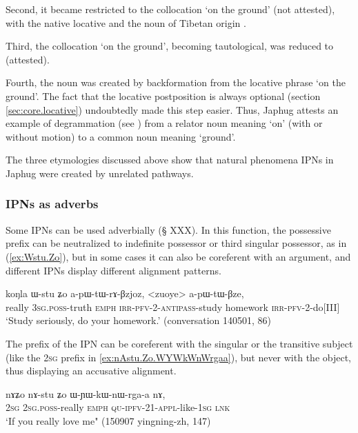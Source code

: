   Second, it  became restricted to the collocation  `on the ground' (not attested), with the native locative  and the  noun of Tibetan origin .
  
    Third, the collocation  `on the ground', becoming tautological, was reduced to  (attested).
 
 Fourth, the noun  was created by backformation from the locative phrase  `on the ground'. The fact that the locative postposition  is always optional (section \ref{sec:core.locative}) undoubtedly made this step easier.  Thus, Japhug attests an example of degrammation (see \citealt[135]{norde09degrammaticalization}) from a relator noun meaning `on' (with or without motion) to a common noun meaning `ground'. 

The three etymologies discussed above show that natural phenomena IPNs in Japhug were created by unrelated pathways.

\subsubsection{IPNs as adverbs}
Some IPNs can be used adverbially (§ XXX). In this function, the possessive prefix can be neutralized to indefinite possessor or third singular possessor, as  in (\ref{ex:Wstu.Zo}), but in some cases it can also be coreferent with an argument, and different IPNs display different alignment patterns.

\begin{exe}
\ex \label{ex:Wstu.Zo}
\gll koŋla ɯ-stu ʑo a-pɯ-tɯ-rɤ-βzjoz, <zuoye> a-pɯ-tɯ-βze, \\
really \textsc{3sg}.\textsc{poss}-truth \textsc{emph} \textsc{irr}-\textsc{pfv}-2-\textsc{antipass}-study homework \textsc{irr}-\textsc{pfv}-2-do[III] \\
\glt `Study seriously, do your homework.' (conversation 140501, 86)
\end{exe}

The prefix of the IPN  can be coreferent with the singular or the transitive subject (like the \textsc{2sg} prefix  in \ref{ex:nAstu.Zo.WYWkWnWrgaa}), but never with the object, thus displaying an accusative alignment.

\begin{exe}
\ex \label{ex:nAstu.Zo.WYWkWnWrgaa}
\gll nɤʑo nɤ-stu ʑo ɯ-ɲɯ-kɯ-nɯ-rga-a nɤ, \\
\textsc{2sg} \textsc{2sg}.\textsc{poss}-really \textsc{emph} \textsc{qu}-\textsc{ipfv}-2\fl{}1-\textsc{appl}-like-\textsc{1sg} \textsc{lnk} \\
\glt `If you really love me" (150907 yingning-zh, 147)
\end{exe}

